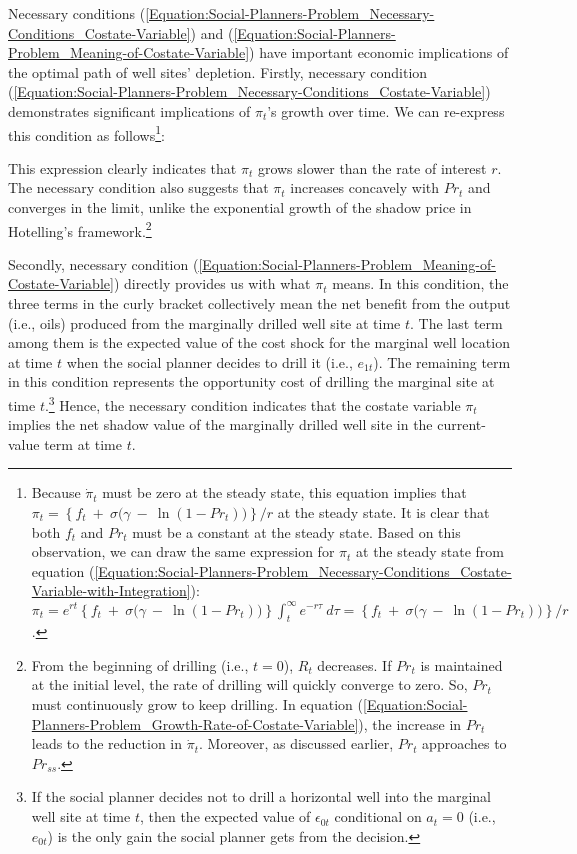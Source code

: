 Necessary conditions (\ref{Equation:Social-Planners-Problem_Necessary-Conditions_Costate-Variable}) and (\ref{Equation:Social-Planners-Problem_Meaning-of-Costate-Variable}) have important economic implications of the optimal path of well sites' depletion. Firstly,  necessary condition (\ref{Equation:Social-Planners-Problem_Necessary-Conditions_Costate-Variable}) demonstrates significant implications of $\pi_{t}$'s growth over time. We can re-express this condition as follows\footnote{Because $\dot{\pi}_{t}$ must be zero at the steady state, this equation implies that $\pi_{t} = \left\{ f_{t} \ + \ \sigma \big( \gamma \ - \ \ln(1 - Pr_{t}) \big) \right\} / r$ at the steady state. It is clear that both $f_{t}$ and $Pr_{t}$ must be a constant at the steady state. Based on this observation, we can draw the same expression for $\pi_{t}$ at the steady state from equation (\ref{Equation:Social-Planners-Problem_Necessary-Conditions_Costate-Variable-with-Integration}): $\pi_{t} = e^{rt} \left\{ f_{t} \ + \ \sigma \big( \gamma \ - \ \ln(1 - Pr_{t}) \big) \right\} \int_{t}^{\infty} e^{-r\tau} \ d\tau = \left\{ f_{t} \ + \ \sigma \big( \gamma \ - \ \ln(1 - Pr_{t}) \big) \right\} / r$.}:

This expression clearly indicates that $\pi_{t}$ grows slower than the rate of interest $r$. The necessary condition also suggests that $\pi_{t}$ increases concavely with $Pr_{t}$ and converges in the limit, unlike the exponential growth of the shadow price in Hotelling's framework.\footnote{From the beginning of drilling (i.e., $t = 0$), $R_{t}$ decreases. If $Pr_{t}$ is maintained at the initial level, the rate of drilling will quickly converge to zero. So, $Pr_{t}$ must continuously grow to keep drilling. In equation (\ref{Equation:Social-Planners-Problem_Growth-Rate-of-Costate-Variable}), the increase in $Pr_{t}$ leads to the reduction in $\dot{\pi}_{t}$. Moreover, as discussed earlier, $Pr_{t}$ approaches to $Pr_{ss}$.} 

Secondly, necessary condition (\ref{Equation:Social-Planners-Problem_Meaning-of-Costate-Variable}) directly provides us with what $\pi_{t}$ means. In this condition, the three terms in the curly bracket collectively mean the net benefit from the output (i.e., oils) produced from the marginally drilled well site at time $t$. The last term among them is the expected value of the cost shock for the marginal well location at time $t$ when the social planner decides to drill it (i.e., $e_{1t}$). The remaining term in this condition represents the opportunity cost of drilling the marginal site at time $t$.\footnote{If the social planner decides not to drill a horizontal well into the marginal well site at time $t$, then the expected value of $\epsilon_{0t}$ conditional on $a_{t} = 0$ (i.e., $e_{0t}$) is the only gain the social planner gets from the decision.} Hence, the necessary condition indicates that the costate variable $\pi_{t}$ implies the net shadow value of the marginally drilled well site in the current-value term at time $t$. 

